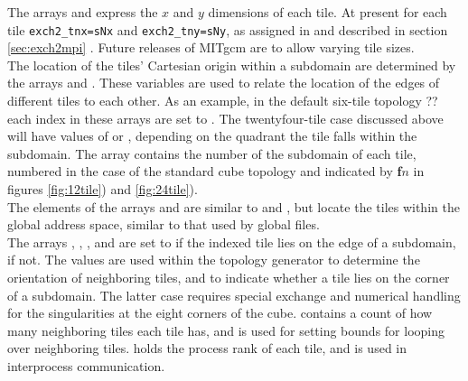 The arrays  and
 express the $x$ and $y$ dimensions of
each tile.  At present for each tile \texttt{exch2\_tnx=sNx} and
\texttt{exch2\_tny=sNy}, as assigned in  and described in
section \ref{sec:exch2mpi} .  Future releases of MITgcm are to allow varying tile
sizes. \\

The location of the tiles' Cartesian origin within a subdomain are
determined by the arrays  and
.  These variables are used to
relate the location of the edges of different tiles to each other.  As
an example, in the default six-tile topology ??  each index in these
arrays are set to .  The twentyfour-tile case discussed above
will have values of  or , depending on the quadrant
the tile falls within the subdomain.  The array
 contains the number of the
subdomain of each tile, numbered  in the case of the
standard cube topology and indicated by \textbf{\textsf{f}}$n$ in
figures \ref{fig:12tile}) and \ref{fig:24tile}). \\

The elements of the arrays 
and  are similar to
 and
, but locate the tiles within the
global address space, similar to that used by global files. \\

The arrays ,
,
, and
 are set to  if the
indexed tile lies on the edge of a subdomain,  if not.  The
values are used within the topology generator to determine the
orientation of neighboring tiles, and to indicate whether a tile lies
on the corner of a subdomain.  The latter case requires special
exchange and numerical handling for the singularities at the eight
corners of the cube.  
contains a count of how many neighboring tiles each tile has, and is
used for setting bounds for looping over neighboring tiles.
 holds the process rank of each
tile, and is used in interprocess communication.  \\

